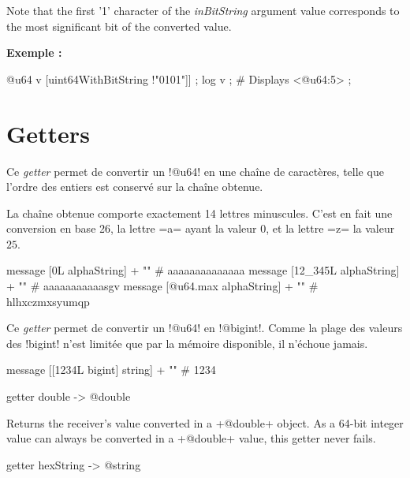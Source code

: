 Note that the first '1' character of the \emph{inBitString} argument value corresponds to the most significant bit of the converted value.

\textbf{Exemple :}
\begin{galgas4}
@u64 v [uint64WithBitString !"0101"]] ;
log v ; # Displays <@u64:5> ;
\end{galgas4}


\section{Getters}



Ce \emph{getter} permet de convertir un \ggsq!@u64! en une chaîne de caractères, telle que l'ordre des entiers est conservé sur la chaîne obtenue.

La chaîne obtenue comporte exactement 14 lettres minuscules. C'est en fait une conversion en base 26, la lettre \ggsq=a= ayant la valeur $0$, et la lettre \ggsq=z= la valeur $25$.


\begin{galgas4}
  message [0L alphaString] + "\n"          # aaaaaaaaaaaaaa
  message [12_345L alphaString] + "\n"     # aaaaaaaaaaasgv
  message [@u64.max alphaString] + "\n" # hlhxczmxsyumqp
\end{galgas4}


Ce \emph{getter} permet de convertir un \ggsq!@u64! en \ggsq!@bigint!. Comme la plage des valeurs des \ggsq!bigint! n'est limitée que par la mémoire disponible, il n'échoue jamais.

\begin{galgas4}
  message [[1234L bigint] string] + "\n" # 1234
\end{galgas4}



\begin{galgas4}
getter double -> @double
\end{galgas4}

Returns the receiver's value converted in a \ggsq+@double+ object. As a 64-bit integer value can always be converted in a \ggsq+@double+ value, this getter never fails.





\begin{galgas4}
getter hexString -> @string
\end{galgas4}

